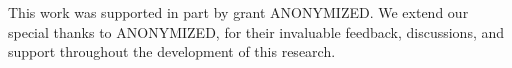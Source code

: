 This work was supported in part by grant ANONYMIZED. We extend our special thanks to ANONYMIZED, for their invaluable feedback, discussions, and support throughout the development of this research.